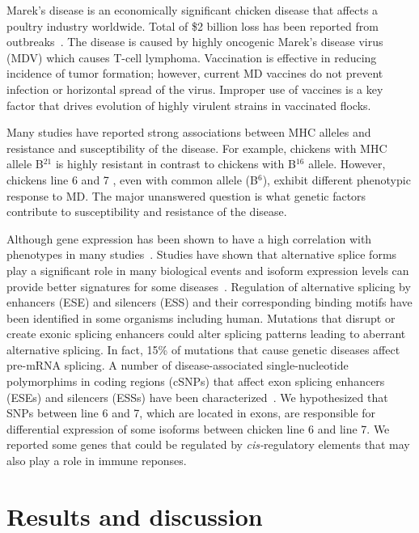 \documentclass[10pt]{article}
\begin{document}
Marek's disease is an economically significant chicken disease that affects a poultry industry worldwide.
Total of \$2 billion loss has been reported from outbreaks~\cite{}.
The disease is caused by highly oncogenic Marek's disease virus (MDV) which causes T-cell lymphoma.
Vaccination is effective in reducing incidence of tumor formation; however, current MD vaccines do not
prevent infection or horizontal spread of the virus.
Improper use of vaccines is a key factor that drives evolution of highly virulent strains in vaccinated
flocks.

Many studies have reported strong associations between MHC alleles and resistance and susceptibility of
the disease. For example, chickens with MHC allele B$^{21}$ is highly resistant in contrast to chickens with
B$^{16}$ allele.
However, chickens line 6 and 7 , even with common allele (B$^6$), exhibit different phenotypic response to
MD.
The major unanswered question is what genetic factors contribute to susceptibility and resistance of
the disease.

Although gene expression has been shown to have a high correlation with phenotypes in many studies~\cite{}.
Studies have shown that alternative splice forms play a significant role in many biological events and
isoform expression levels can provide better signatures for some diseases~\cite{zhang2013isoform}.
Regulation of alternative splicing by enhancers (ESE) and silencers (ESS) and their corresponding
binding motifs have been identified in some organisms including human.
Mutations that disrupt or create exonic splicing enhancers could alter splicing patterns leading to aberrant alternative splicing.
In fact, 15\% of mutations that cause genetic diseases affect pre-mRNA splicing.
A number of disease-associated single-nucleotide polymorphims in coding regions (cSNPs) that affect exon splicing enhancers (ESEs) and
silencers (ESSs) have been characterized~\cite{blencowe2000exonic, wang2007splicing}.
We hypothesized that SNPs between line 6 and 7, which are located in exons, are responsible for differential
expression of some isoforms between chicken line 6 and line 7.
We reported some genes that could be regulated by \textit{cis-}regulatory elements that may also play a role in
immune reponses.


\section*{Results and discussion}
\end{document}

